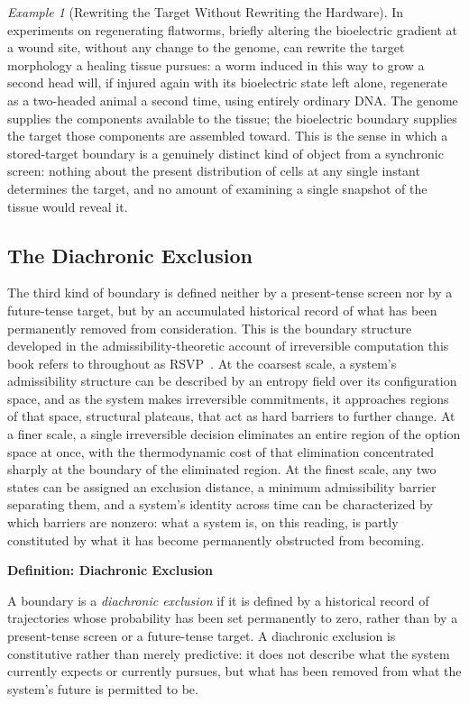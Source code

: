\documentclass[11pt,fleqn]{book}
\numberwithin{equation}{chapter}
\newenvironment{definition}[1]
  {\begin{definitionEnv}
   \noindent\textbf{Definition: #1}\par\smallskip}
  {\end{definitionEnv}}
\theoremstyle{plain}
\theoremstyle{definition}
\theoremstyle{remark}
\newtheorem{example}[theorem]{Example}
\begin{document}
\begin{example}[Rewriting the Target Without Rewriting the Hardware]
In experiments on regenerating flatworms, briefly altering the bioelectric gradient at a wound site, without any change to the genome, can rewrite the target morphology a healing tissue pursues: a worm induced in this way to grow a second head will, if injured again with its bioelectric state left alone, regenerate as a two-headed animal a second time, using entirely ordinary DNA. The genome supplies the components available to the tissue; the bioelectric boundary supplies the target those components are assembled toward. This is the sense in which a stored-target boundary is a genuinely distinct kind of object from a synchronic screen: nothing about the present distribution of cells at any single instant determines the target, and no amount of examining a single snapshot of the tissue would reveal it.
\end{example}

\subsection{The Diachronic Exclusion}

The third kind of boundary is defined neither by a present-tense screen nor by a future-tense target, but by an accumulated historical record of what has been permanently removed from consideration. This is the boundary structure developed in the admissibility-theoretic account of irreversible computation this book refers to throughout as RSVP~\cite{holonomic}. At the coarsest scale, a system's admissibility structure can be described by an entropy field over its configuration space, and as the system makes irreversible commitments, it approaches regions of that space, structural plateaus, that act as hard barriers to further change. At a finer scale, a single irreversible decision eliminates an entire region of the option space at once, with the thermodynamic cost of that elimination concentrated sharply at the boundary of the eliminated region. At the finest scale, any two states can be assigned an exclusion distance, a minimum admissibility barrier separating them, and a system's identity across time can be characterized by which barriers are nonzero: what a system is, on this reading, is partly constituted by what it has become permanently obstructed from becoming.

\begin{definition}{Diachronic Exclusion}
A boundary is a \emph{diachronic exclusion} if it is defined by a historical record of trajectories whose probability has been set permanently to zero, rather than by a present-tense screen or a future-tense target. A diachronic exclusion is constitutive rather than merely predictive: it does not describe what the system currently expects or currently pursues, but what has been removed from what the system's future is permitted to be.
\end{definition}
\end{document}
